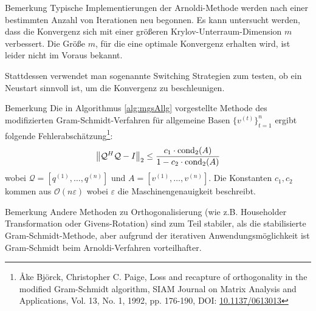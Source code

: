 \begin{colbox}{Bemerkung}
  Typische Implementierungen der Arnoldi-Methode werden nach einer bestimmten Anzahl von Iterationen neu begonnen.
  Es kann untersucht werden, dass die Konvergenz sich mit einer größeren Krylov-Unterraum-Dimension $m$ verbessert.
  Die Größe $m$, für die eine optimale Konvergenz erhalten wird, ist leider nicht im Voraus bekannt. 

  Stattdessen verwendet man sogenannte \glqq{}Switching\grqq{} Strategien zum testen, ob ein Neustart sinnvoll ist, 
  um die Konvergenz zu beschleunigen.
\end{colbox}

\begin{colbox}{Bemerkung}
  Die in Algorithmus \ref{alg:mgsAllg} vorgestellte Methode des modifizierten Gram-Schmidt-Verfahren für allgemeine 
  Basen $\{v^{(t)}\}_{t=1}^n$ ergibt folgende Fehlerabschätzung\footnote{
    Åke Björck, Christopher C. Paige, Loss and recapture of orthogonality in the modified Gram-Schmidt algorithm, 
    SIAM Journal on Matrix Analysis and Applications, Vol. 13, No. 1, 1992, pp. 176-190, DOI: 
    \href{https://doi.org/10.1137/0613013}{10.1137/0613013}
  }:
  \begin{align*}
    \vertn{2}{\mathcal{Q}^{H}\mathcal{Q}-I}_2 \leq \dfrac{c_1\cdot \Cond_2(A)}{1-c_2\cdot\Cond_2(A)}
  \end{align*}
  wobei $\mathcal{Q} = [q^{(1)}, \dots, q^{(n)}]$ und $A=[v^{(1)}, \dots, v^{(n)}]$. Die Konstanten $c_1,c_2$ kommen 
  aus $\mathcal{O}(n\varepsilon)$ wobei $\varepsilon$ die Maschinengenauigkeit beschreibt.
\end{colbox}

\begin{colbox}{Bemerkung}
  Andere Methoden zu Orthogonalisierung (wie z.B. Householder Transformation oder Givens-Rotation) sind zum Teil 
  stabiler, als die stabilisierte Gram-Schmidt-Methode, aber aufgrund der iterativen Anwendungsmöglichkeit ist 
  Gram-Schmidt beim Arnoldi-Verfahren vorteilhafter.
\end{colbox}

